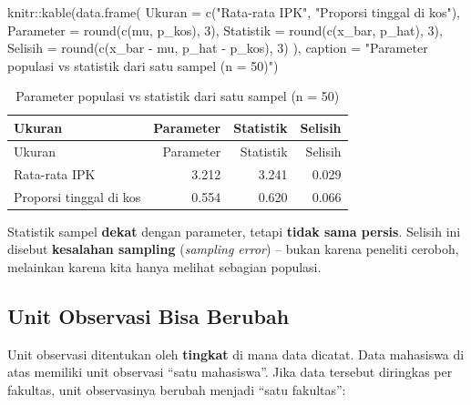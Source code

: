\documentclass[
  indonesian,
  letterpaper,
]{book}
\newenvironment{Shaded}{\begin{snugshade}}{\end{snugshade}}
\newcommand{\AttributeTok}[1]{\textcolor[rgb]{0.40,0.45,0.13}{#1}}
\newcommand{\DecValTok}[1]{\textcolor[rgb]{0.68,0.00,0.00}{#1}}
\newcommand{\FunctionTok}[1]{\textcolor[rgb]{0.28,0.35,0.67}{#1}}
\newcommand{\NormalTok}[1]{\textcolor[rgb]{0.00,0.23,0.31}{#1}}
\newcommand{\SpecialCharTok}[1]{\textcolor[rgb]{0.37,0.37,0.37}{#1}}
\newcommand{\StringTok}[1]{\textcolor[rgb]{0.13,0.47,0.30}{#1}}
\begin{document}
\begin{Shaded}
\begin{Highlighting}[]
\NormalTok{knitr}\SpecialCharTok{::}\FunctionTok{kable}\NormalTok{(}\FunctionTok{data.frame}\NormalTok{(}
\AttributeTok{Ukuran =} \FunctionTok{c}\NormalTok{(}\StringTok{"Rata{-}rata IPK"}\NormalTok{, }\StringTok{"Proporsi tinggal di kos"}\NormalTok{),}
\AttributeTok{Parameter =} \FunctionTok{round}\NormalTok{(}\FunctionTok{c}\NormalTok{(mu, p\_kos), }\DecValTok{3}\NormalTok{),}
\AttributeTok{Statistik =} \FunctionTok{round}\NormalTok{(}\FunctionTok{c}\NormalTok{(x\_bar, p\_hat), }\DecValTok{3}\NormalTok{),}
\AttributeTok{Selisih =} \FunctionTok{round}\NormalTok{(}\FunctionTok{c}\NormalTok{(x\_bar }\SpecialCharTok{{-}}\NormalTok{ mu, p\_hat }\SpecialCharTok{{-}}\NormalTok{ p\_kos), }\DecValTok{3}\NormalTok{)}
\NormalTok{), }\AttributeTok{caption =} \StringTok{"Parameter populasi vs statistik dari satu sampel (n = 50)"}\NormalTok{)}
\end{Highlighting}
\end{Shaded}

\begin{longtable}[]{@{}lrrr@{}}
\caption{Parameter populasi vs statistik dari satu sampel (n =
50)}\tabularnewline
\toprule\noalign{}
Ukuran & Parameter & Statistik & Selisih \\
\midrule\noalign{}
\endfirsthead
\toprule\noalign{}
Ukuran & Parameter & Statistik & Selisih \\
\midrule\noalign{}
\endhead
\bottomrule\noalign{}
\endlastfoot
Rata-rata IPK & 3.212 & 3.241 & 0.029 \\
Proporsi tinggal di kos & 0.554 & 0.620 & 0.066 \\
\end{longtable}

Statistik sampel \textbf{dekat} dengan parameter, tetapi \textbf{tidak
sama persis}. Selisih ini disebut \textbf{kesalahan sampling}
(\emph{sampling error}) -- bukan karena peneliti ceroboh, melainkan
karena kita hanya melihat sebagian populasi.

\subsection{Unit Observasi Bisa
Berubah}\label{unit-observasi-bisa-berubah}

Unit observasi ditentukan oleh \textbf{tingkat} di mana data dicatat.
Data mahasiswa di atas memiliki unit observasi ``satu mahasiswa''. Jika
data tersebut diringkas per fakultas, unit observasinya berubah menjadi
``satu fakultas'':
\end{document}
